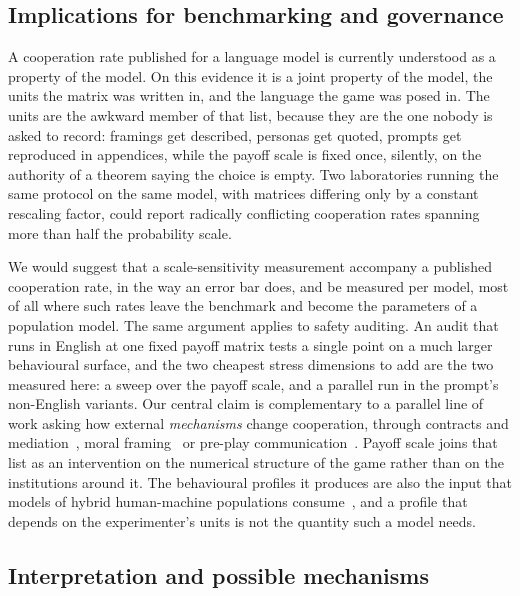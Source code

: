 \documentclass[11pt,a4paper]{article}
\begin{document}
\subsection{Implications for benchmarking and governance}\label{sec:disc_benchmarking}

A cooperation rate published for a language model is currently understood as a
property of the model. On this evidence it is a joint property of the model,
the units the matrix was written in, and the language the game was posed in.
The units are the awkward member of that list, because they are the one nobody
is asked to record: framings get described, personas get quoted, prompts get
reproduced in appendices, while the payoff scale is fixed once, silently, on
the authority of a theorem saying the choice is empty. Two laboratories running
the same protocol on the same model, with matrices differing only by a constant
rescaling factor, could report radically conflicting cooperation rates spanning
more than half the probability scale.

We would suggest that a scale-sensitivity measurement accompany a published
cooperation rate, in the way an error bar does, and be measured per model, most
of all where such rates leave the benchmark and become the parameters of a
population model. The same argument applies to safety auditing. An audit that
runs in English at one fixed payoff matrix tests a single point on a much
larger behavioural surface, and the two cheapest stress dimensions to add are
the two measured here: a sweep over the payoff scale, and a parallel run in the
prompt's non-English variants. Our central claim is complementary to a
parallel line of work asking how external \emph{mechanisms} change cooperation,
through contracts and mediation~\cite{tewolde2026coopeval}, moral
framing~\cite{backmann2025moralsim} or pre-play
communication~\cite{loreheydari2026communication}. Payoff scale joins that list
as an intervention on the numerical structure of the game rather than on the
institutions around it. The behavioural profiles it
produces are also the input that models of hybrid human-machine populations
consume~\cite{han2026social}, and a profile that depends on the experimenter's
units is not the quantity such a model needs.

\subsection{Interpretation and possible mechanisms}\label{sec:disc_mechanisms}
\end{document}

